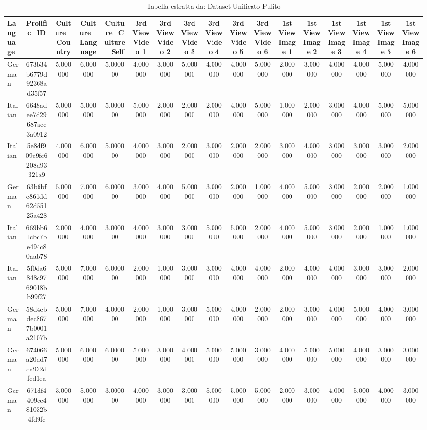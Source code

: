 \begin{table}[htbp]
\caption{Tabella estratta da: Dataset Unificato Pulito}
\label{tab:dataset_unificato_pulito}
\begin{tabular}{lcccccccccccccccc}
\toprule
Language & Prolific\_ID & Culture\_Country & Culture\_Language & Culture\_Culture\_Self & 3rd View Video 1 & 3rd View Video 2 & 3rd View Video 3 & 3rd View Video 4 & 3rd View Video 5 & 3rd View Video 6 & 1st View Image 1 & 1st View Image 2 & 1st View Image 3 & 1st View Image 4 & 1st View Image 5 & 1st View Image 6 \\
\midrule
German & 673b34b6779d92368ad35f57 & 5.000000 & 6.000000 & 5.000000 & 4.000000 & 3.000000 & 5.000000 & 4.000000 & 4.000000 & 5.000000 & 2.000000 & 3.000000 & 4.000000 & 4.000000 & 5.000000 & 4.000000 \\
Italian & 6648adee7d29687acc3a0912 & 5.000000 & 5.000000 & 5.000000 & 5.000000 & 2.000000 & 2.000000 & 2.000000 & 4.000000 & 5.000000 & 1.000000 & 2.000000 & 3.000000 & 4.000000 & 5.000000 & 5.000000 \\
Italian & 5e8df909e9fe6208d93321a9 & 4.000000 & 6.000000 & 5.000000 & 4.000000 & 3.000000 & 2.000000 & 3.000000 & 2.000000 & 2.000000 & 3.000000 & 4.000000 & 3.000000 & 3.000000 & 3.000000 & 2.000000 \\
German & 63b6bfc861dd62d55125a428 & 5.000000 & 7.000000 & 6.000000 & 3.000000 & 4.000000 & 5.000000 & 3.000000 & 2.000000 & 1.000000 & 4.000000 & 5.000000 & 3.000000 & 2.000000 & 2.000000 & 1.000000 \\
Italian & 669bb61cbc7be494c80aab78 & 2.000000 & 4.000000 & 3.000000 & 4.000000 & 3.000000 & 3.000000 & 5.000000 & 5.000000 & 2.000000 & 4.000000 & 5.000000 & 3.000000 & 2.000000 & 1.000000 & 1.000000 \\
Italian & 5f0da6848c9769018bb99f27 & 5.000000 & 7.000000 & 6.000000 & 2.000000 & 1.000000 & 3.000000 & 3.000000 & 4.000000 & 4.000000 & 2.000000 & 4.000000 & 4.000000 & 3.000000 & 3.000000 & 2.000000 \\
German & 58d4ebdec8677b0001a2107b & 5.000000 & 7.000000 & 4.000000 & 2.000000 & 1.000000 & 3.000000 & 5.000000 & 4.000000 & 2.000000 & 2.000000 & 3.000000 & 4.000000 & 5.000000 & 4.000000 & 3.000000 \\
German & 674066a20dd7ea932dfcd1ea & 5.000000 & 6.000000 & 6.000000 & 5.000000 & 3.000000 & 4.000000 & 5.000000 & 5.000000 & 3.000000 & 4.000000 & 5.000000 & 5.000000 & 4.000000 & 3.000000 & 3.000000 \\
German & 671df4409cc481032b4fd9fc & 3.000000 & 5.000000 & 3.000000 & 4.000000 & 3.000000 & 3.000000 & 5.000000 & 5.000000 & 5.000000 & 2.000000 & 3.000000 & 4.000000 & 5.000000 & 4.000000 & 3.000000 \\

\end{tabular}
\end{table}
